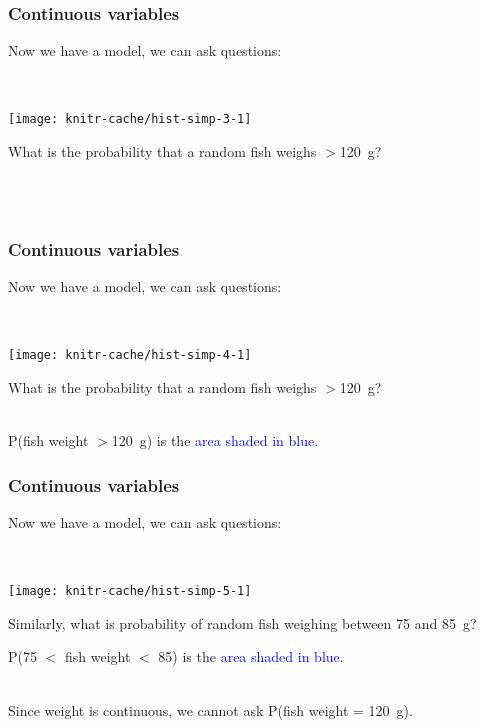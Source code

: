 
\begin{frame}
\frametitle{Continuous variables}

Now we have a model, we can ask questions:

~\\

\begin{knitrout}
\color{fgcolor}
\texttt{[image: knitr-cache/hist-simp-3-1]}

\end{knitrout}

What is the probability that a random fish weighs $>$120~g?

~\\

~\\

\end{frame}



\begin{frame}
\frametitle{Continuous variables}

Now we have a model, we can ask questions:

~\\

\begin{knitrout}
\color{fgcolor}
\texttt{[image: knitr-cache/hist-simp-4-1]}

\end{knitrout}

What is the probability that a random fish weighs $>$120~g?

~\\

P(fish weight $>$120~g) is the \textcolor{blue}{area shaded in blue}.


\end{frame}



\begin{frame}
\frametitle{Continuous variables}

Now we have a model, we can ask questions:

~\\

\begin{knitrout}
\color{fgcolor}
\texttt{[image: knitr-cache/hist-simp-5-1]}

\end{knitrout}

Similarly, what is probability of random fish weighing between 75 and 85~g?

P(75 $<$ fish weight $<$ 85) is the \textcolor{blue}{area shaded in blue}.

~\\

Since weight is continuous, we cannot ask P(fish weight = 120~g).

\end{frame}


